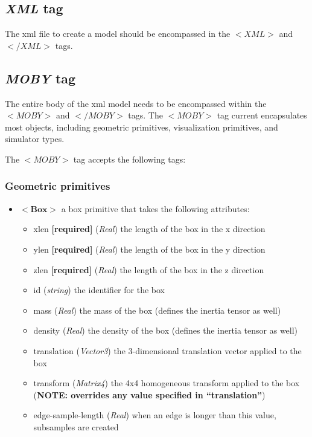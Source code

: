 \documentclass{article}
\begin{document}
\begin{landscape}
\subsection {\emph{XML} tag}
The xml file to create a model should be encompassed in the $<XML>$ and $</XML>$ tags.


\subsection {\emph{MOBY} tag}
The entire body of the xml model needs to be encompassed within the $<MOBY>$ and $</MOBY>$ tags.  The $<MOBY>$ tag current encapsulates most objects, including geometric primitives, visualization primitives, and simulator types.

The $<MOBY>$ tag accepts the following tags:

\subsubsection{Geometric primitives}
\begin{itemize}
\item $<\textbf{Box}>$ a box primitive that takes the following attributes:
\begin{itemize}
\item xlen \textbf{[required]} (\emph{Real})  the length of the box in the x direction
\item ylen \textbf{[required]} (\emph{Real})  the length of the box in the y direction
\item zlen \textbf{[required]} (\emph{Real})  the length of the box in the z direction
\item id  (\emph{string})  the identifier for the box
\item mass (\emph{Real}) the mass of the box (defines the inertia tensor as well)
\item density (\emph{Real}) the density of the box (defines the inertia tensor as well)
\item translation (\emph{Vector3}) the 3-dimensional translation vector applied to the box 
\item transform (\emph{Matrix4}) the 4x4 homogeneous transform applied to the box (\textbf{NOTE: overrides any value specified in ``translation''})
\item edge-sample-length (\emph{Real}) when an edge is longer than this value, subsamples are created
\end{itemize}


\end{itemize}
\end{landscape}
\end{document}
